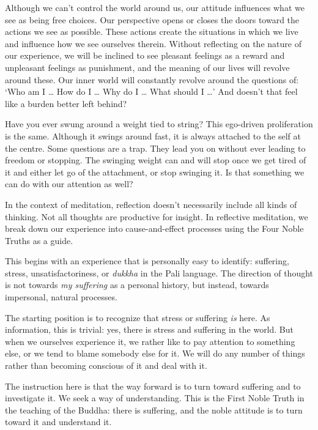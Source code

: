 Although we can't control the world around us, our attitude influences
what we see as being free choices. Our perspective opens or closes the
doors toward the actions we see as possible. These actions create the
situations in which we live and influence how we see ourselves therein.
Without reflecting on the nature of our experience, we will be inclined
to see pleasant feelings as a reward and unpleasant feelings as
punishment, and the meaning of our lives will revolve around these. Our
inner world will constantly revolve around the questions of: `Who am I
\ldots{} How do I \ldots{} Why do I \ldots{} What should I \ldots{}' And
doesn't that feel like a burden better left behind?


Have you ever swung around a weight tied to string? This ego-driven
proliferation is the same. Although it swings around fast, it is always
attached to the self at the centre. Some questions are a trap. They lead
you on without ever leading to freedom or stopping. The swinging weight
can and will stop once we get tired of it and either let go of the
attachment, or stop swinging it. Is that something we can do with our
attention as well?

In the context of meditation, reflection doesn't necessarily include all
kinds of thinking. Not all thoughts are productive for insight. In
reflective meditation, we break down our experience into
cause-and-effect processes using the Four Noble Truths as a guide.

This begins with an experience that is personally easy to identify:
suffering, stress, unsatisfactoriness, or \emph{dukkha} in the Pali
language. The direction of thought is not towards \emph{my suffering} as
a personal history, but instead, towards impersonal, natural processes.


The starting position is to recognize that stress or suffering \emph{is}
here. As information, this is trivial: yes, there is stress and
suffering in the world. But when we ourselves experience it, we rather
like to pay attention to something else, or we tend to blame somebody
else for it. We will do any number of things rather than becoming
conscious of it and deal with it.

The instruction here is that the way forward is to turn toward suffering
and to investigate it. We seek a way of understanding. This is the First
Noble Truth in the teaching of the Buddha: there is suffering, and the
noble attitude is to turn toward it and understand it.

